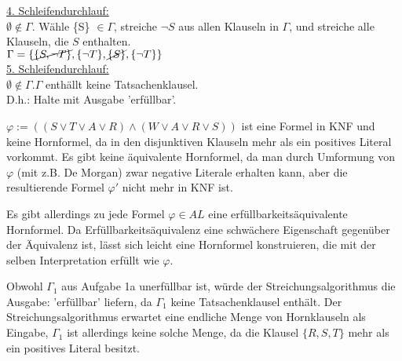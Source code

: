 \documentclass[a4paper,10pt]{article}
\begin{document}
\begin{compactenum} [(a)]
		\underline{4. Schleifendurchlauf: }\\
		$ \emptyset \not\in \Gamma. $ Wähle \{S\} $ \in \Gamma $, streiche $ \lnot S $ aus allen Klauseln in $ \Gamma $, und streiche alle Klauseln, die $ S $ enthalten.\\
		$ \Gamma = \{\cancel{\{S,\lnot T\}}, \{\lnot T\}, \cancel{\{S\}}, \{\lnot T\}\} $\\
		
		\underline{5. Schleifendurchlauf: }\\
		$ \emptyset \not\in \Gamma. \Gamma $ enthällt keine Tatsachenklausel.\\
		D.h.: Halte mit Ausgabe 'erfüllbar'.\\
		
		\item \begin{compactenum} [(i)]
			\item $ \varphi := ((S\vee T\vee A \vee R)\wedge (W\vee A \vee R\vee S)) $ ist eine Formel in KNF und keine Hornformel, da in den disjunktiven Klauseln mehr als ein positives Literal vorkommt. Es gibt keine äquivalente Hornformel, da man durch Umformung von $ \varphi $ (mit z.B. De Morgan) zwar negative Literale erhalten kann, aber die resultierende Formel $ \varphi' $ nicht mehr in KNF ist. 
			\item Es gibt allerdings zu jede Formel $\varphi \in AL $ eine erfüllbarkeitsäquivalente Hornformel. Da Erfüllbarkeitsäquivalenz eine schwächere Eigenschaft gegenüber der Äquivalenz ist, lässt sich leicht eine Hornformel konstruieren, die mit der selben Interpretation erfüllt wie $ \varphi $.
		\end{compactenum}
		
		\item Obwohl $ \Gamma_1 $ aus Aufgabe 1a unerfüllbar ist, würde der Streichungsalgorithmus die Ausgabe: 'erfüllbar' liefern, da $ \Gamma_1 $ keine Tatsachenklausel enthält. Der Streichungsalgorithmus erwartet eine endliche Menge von Hornklauseln als Eingabe, $ \Gamma_1 $ ist allerdings keine solche Menge, da die Klausel $ \{R,S,T\} $ mehr als ein positives Literal besitzt. 
	\end{compactenum}\ \\
\end{document}
